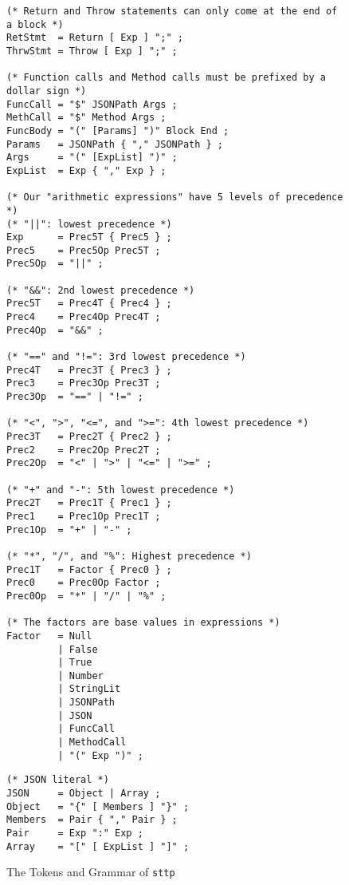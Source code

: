 \begin{figure}[H]\ContinuedFloat
    \begin{verbatim}
(* Return and Throw statements can only come at the end of a block *)
RetStmt  = Return [ Exp ] ";" ;
ThrwStmt = Throw [ Exp ] ";" ;

(* Function calls and Method calls must be prefixed by a dollar sign *)
FuncCall = "$" JSONPath Args ;
MethCall = "$" Method Args ;
FuncBody = "(" [Params] ")" Block End ;
Params   = JSONPath { "," JSONPath } ;
Args     = "(" [ExpList] ")" ;
ExpList  = Exp { "," Exp } ;

(* Our "arithmetic expressions" have 5 levels of precedence *)
(* "||": lowest precedence *)
Exp      = Prec5T { Prec5 } ;
Prec5    = Prec5Op Prec5T ;
Prec5Op  = "||" ;

(* "&&": 2nd lowest precedence *)
Prec5T   = Prec4T { Prec4 } ;
Prec4    = Prec4Op Prec4T ;
Prec4Op  = "&&" ;

(* "==" and "!=": 3rd lowest precedence *)
Prec4T   = Prec3T { Prec3 } ;
Prec3    = Prec3Op Prec3T ;
Prec3Op  = "==" | "!=" ;

(* "<", ">", "<=", and ">=": 4th lowest precedence *)
Prec3T   = Prec2T { Prec2 } ;
Prec2    = Prec2Op Prec2T ;
Prec2Op  = "<" | ">" | "<=" | ">=" ;

(* "+" and "-": 5th lowest precedence *)
Prec2T   = Prec1T { Prec1 } ;
Prec1    = Prec1Op Prec1T ;
Prec1Op  = "+" | "-" ;

(* "*", "/", and "%": Highest precedence *)
Prec1T   = Factor { Prec0 } ;
Prec0    = Prec0Op Factor ;
Prec0Op  = "*" | "/" | "%" ;

(* The factors are base values in expressions *)
Factor   = Null
         | False
         | True
         | Number
         | StringLit
         | JSONPath
         | JSON
         | FuncCall
         | MethodCall
         | "(" Exp ")" ;
    \end{verbatim}
\end{figure}

\begin{figure}[H]\ContinuedFloat
    \begin{verbatim}
(* JSON literal *)
JSON     = Object | Array ;
Object   = "{" [ Members ] "}" ;
Members  = Pair { "," Pair } ;
Pair     = Exp ":" Exp ;
Array    = "[" [ ExpList ] "]" ;
    \end{verbatim}
    \cprotect\caption{The Tokens and Grammar of \verb|sttp|}
\end{figure}

